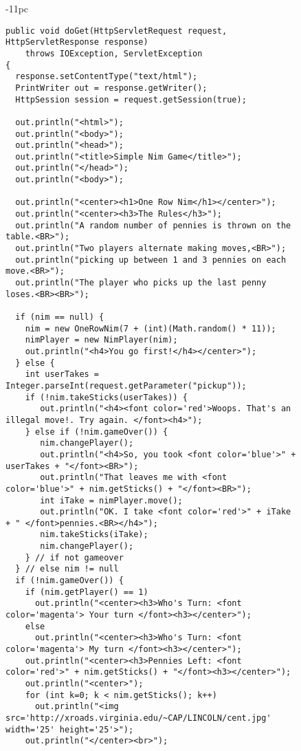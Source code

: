 {{{{\begin{figure}[p]
\jjjprogstart
\begin{jjjlistingleft}[37pc]{-11pc}
\begin{lstlisting}[basicstyle=\scriptsize]
public void doGet(HttpServletRequest request, HttpServletResponse response)
    throws IOException, ServletException
{
  response.setContentType("text/html");
  PrintWriter out = response.getWriter();
  HttpSession session = request.getSession(true);

  out.println("<html>");
  out.println("<body>");
  out.println("<head>");
  out.println("<title>Simple Nim Game</title>");
  out.println("</head>");
  out.println("<body>");

  out.println("<center><h1>One Row Nim</h1></center>");
  out.println("<center><h3>The Rules</h3>");
  out.println("A random number of pennies is thrown on the table.<BR>");
  out.println("Two players alternate making moves,<BR>");
  out.println("picking up between 1 and 3 pennies on each move.<BR>");
  out.println("The player who picks up the last penny loses.<BR><BR>");

  if (nim == null) {
    nim = new OneRowNim(7 + (int)(Math.random() * 11));
    nimPlayer = new NimPlayer(nim);
    out.println("<h4>You go first!</h4></center>");
  } else {
    int userTakes = Integer.parseInt(request.getParameter("pickup"));
    if (!nim.takeSticks(userTakes)) {
       out.println("<h4><font color='red'>Woops. That's an illegal move!. Try again. </font><h4>");
    } else if (!nim.gameOver()) {
       nim.changePlayer();
       out.println("<h4>So, you took <font color='blue'>" + userTakes + "</font><BR>"); 
       out.println("That leaves me with <font color='blue'>" + nim.getSticks() + "</font><BR>");
       int iTake = nimPlayer.move();
       out.println("OK. I take <font color='red'>" + iTake + " </font>pennies.<BR></h4>");
       nim.takeSticks(iTake);
       nim.changePlayer();
    } // if not gameover
  } // else nim != null
  if (!nim.gameOver()) {
    if (nim.getPlayer() == 1)
      out.println("<center><h3>Who's Turn: <font color='magenta'> Your turn </font><h3></center>");
    else
      out.println("<center><h3>Who's Turn: <font color='magenta'> My turn </font><h3></center>");
    out.println("<center><h3>Pennies Left: <font color='red'>" + nim.getSticks() + "</font><h3></center>");
    out.println("<center>");
    for (int k=0; k < nim.getSticks(); k++)
      out.println("<img src='http://xroads.virginia.edu/~CAP/LINCOLN/cent.jpg' width='25' height='25'>");
    out.println("</center><br>");


\end{lstlisting}
\end{jjjlistingleft}
\end{figure}}}}}
